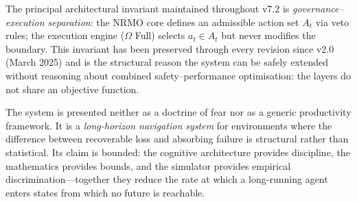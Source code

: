 \medskip\noindent
The principal architectural invariant maintained throughout v7.2 is
\emph{governance--execution separation}: the NRMO core defines an
admissible action set $A_t$ via veto rules; the execution engine
($\Omega$ Full) selects $a_t \in A_t$ but never modifies the boundary.
This invariant has been preserved through every revision since v2.0
(March 2025) and is the structural reason the system can be safely
extended without reasoning about combined safety--performance
optimisation: the layers do not share an objective function.

\medskip\noindent
The system is presented neither as a doctrine of fear nor as a
generic productivity framework. It is a \emph{long-horizon navigation
system} for environments where the difference between recoverable loss
and absorbing failure is structural rather than statistical. Its claim
is bounded: the cognitive architecture provides discipline, the
mathematics provides bounds, and the simulator provides empirical
discrimination---together they reduce the rate at which a long-running
agent enters states from which no future is reachable.
